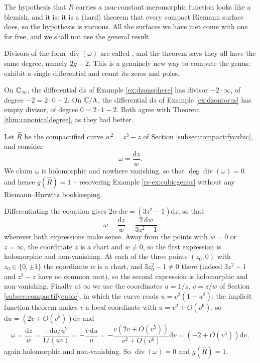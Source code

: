 \documentclass[a4paper]{scrartcl}
\newcommand{\Cinf}{\C_\infty}
\newcommand{\Div}{\operatorname{div}}
\begin{document}
\begin{remark}
	The hypothesis that $R$ carries a non-constant meromorphic function looks like a
	blemish, and it is: it is a (hard) theorem that every compact Riemann surface does, so
	the hypothesis is vacuous. All the surfaces we have met come with one for free, and we
	shall not use the general result.
\end{remark}

Divisors of the form $\Div(\omega)$ are called , and the theorem
says they all have the same degree, namely $2g-2$. This is a genuinely new way to compute
the genus: exhibit a single differential and count its zeros and poles.

\begin{example}
	On $\Cinf$, the differential $\mathrm{d}z$ of Example \ref{ex:dzonsphere} has divisor
	$-2\cdot\infty$, of degree $-2 = 2\cdot 0 - 2$. On $\mathbb{C}/\Lambda$, the differential
	$\mathrm{d}z$ of Example \ref{ex:dzontorus} has empty divisor, of degree $0 = 2\cdot 1 - 2$.
	Both agree with Theorem \ref{thm:canonicaldegree}, as they had better.
\end{example}

\begin{example}
	Let $\hat R$ be the compactified curve $w^2 = z^3-z$ of Section
	\ref{subsec:compactifycubic}, and consider
	$$
	\omega = \frac{\mathrm{d}z}{w}.
	$$
	We claim $\omega$ is holomorphic and nowhere vanishing, so that
	$\deg\Div(\omega) = 0$ and hence $g(\hat R) = 1$ -- recovering Example
	\ref{rs-ex:cubicgenus} without any Riemann--Hurwitz bookkeeping.

	Differentiating the equation gives $2w\,\mathrm{d}w = (3z^2-1)\mathrm{d}z$, so that
	$$
	\omega = \frac{\mathrm{d}z}{w} = \frac{2\,\mathrm{d}w}{3z^2-1}
	$$
	wherever both expressions make sense. Away from the points with $w = 0$ or
	$z = \infty$, the coordinate $z$ is a chart and $w \neq 0$, so the first expression is
	holomorphic and non-vanishing. At each of the three points $(z_0,0)$ with
	$z_0 \in \{0,\pm1\}$ the coordinate $w$ is a chart, and $3z_0^2 - 1 \neq 0$ there
	(indeed $3z^2-1$ and $z^3-z$ have no common root), so the second expression is
	holomorphic and non-vanishing. Finally at $\infty$ we use the coordinates
	$u = 1/z$, $v = z/w$ of Section \ref{subsec:compactifycubic}, in which the curve reads
	$u = v^2(1-u^2)$; the implicit function theorem makes $v$ a local coordinate with
	$u = v^2 + O(v^6)$, so $\mathrm{d}u = (2v + O(v^5))\mathrm{d}v$ and
	$$
	\omega = \frac{\mathrm{d}z}{w} = \frac{-\mathrm{d}u/u^2}{1/(uv)}
	= -\frac{v\,\mathrm{d}u}{u} = -\frac{v(2v+O(v^5))}{v^2 + O(v^6)}\mathrm{d}v
	= \left(-2 + O(v^4)\right)\mathrm{d}v,
	$$
	again holomorphic and non-vanishing. So $\Div(\omega) = 0$ and $g(\hat R) = 1$.
\end{example}
\end{document}
